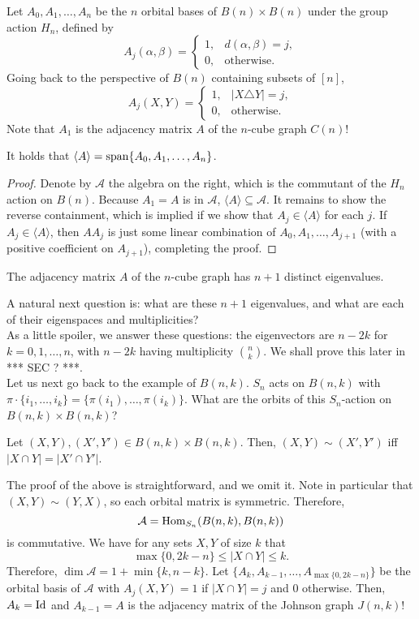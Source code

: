 	Let $A_0,A_1,\ldots,A_n$ be the $n$ orbital bases of $B(n) \times B(n)$ under the group action $H_n$, defined by
	\[ A_j(\alpha,\beta) = \begin{cases} 1, & d(\alpha,\beta) = j, \\ 0, & \text{otherwise.} \end{cases} \]
	Going back to the perspective of $B(n)$ containing subsets of $[n]$,
	\[ A_j(X,Y) = \begin{cases} 1, & |X\triangle Y| = j, \\ 0, & \text{otherwise.} \end{cases} \]
	Note that $A_1$ is the adjacency matrix $A$ of the $n$-cube graph $C(n)$!
	\begin{fprop}
		\label{prop: ncube-adj-eigenvals}
		It holds that $\langle A\rangle = \operatorname{span}\{A_0,A_1,\ldots,A_n\}$.
	\end{fprop}
	\begin{proof}
		Denote by $\mathcal{A}$ the algebra on the right, which is the commutant of the $H_n$ action on $B(n)$. Because $A_1 = A$ is in $\mathcal{A}$, $\langle A\rangle \subseteq \mathcal{A}$. It remains to show the reverse containment, which is implied if we show that $A_j \in \langle A\rangle$ for each $j$. If $A_j \in \langle A\rangle$, then $AA_j$ is just some linear combination of $A_0,A_1,\ldots,A_{j+1}$ (with a positive coefficient on $A_{j+1}$), completing the proof.
	\end{proof}

	\begin{fcor}
		The adjacency matrix $A$ of the $n$-cube graph has $n+1$ distinct eigenvalues.
	\end{fcor}

	A natural next question is: what are these $n+1$ eigenvalues, and what are each of their eigenspaces and multiplicities?\\
	As a little spoiler, we answer these questions: the eigenvectors are $n-2k$ for $k=0,1,\ldots,n$, with $n-2k$ having multiplicity $\binom{n}{k}$. We shall prove this later in *** SEC ? ***. \\

	Let us next go back to the example of $B(n,k)$. $S_n$ acts on $B(n,k)$ with $\pi \cdot \{i_1,\ldots,i_k\} = \{\pi(i_1),\ldots,\pi(i_k)\}$. What are the orbits of this $S_n$-action on $B(n,k) \times B(n,k)$?

	\begin{flem}
		Let $(X,Y), (X',Y') \in B(n,k) \times B(n,k)$. Then, $(X,Y) \sim (X',Y')$ iff $|X \cap Y| = |X' \cap Y'|$.
	\end{flem}
	The proof of the above is straightforward, and we omit it. Note in particular that $(X,Y) \sim (Y,X)$, so each orbital matrix is symmetric. Therefore,
	\[ \mathcal{A} = \operatorname{Hom}_{S_n}(B(n,k),B(n,k)) \]
	is commutative. We have for any sets $X,Y$ of size $k$ that
	\[ \max\{0,2k-n\} \le |X \cap Y| \le k. \]
	Therefore, $\dim \mathcal{A} = 1 + \min\{k,n-k\}$. Let $\{A_k,A_{k-1},\ldots,A_{\max\{0,2k-n\}}\}$ be the orbital basis of $\mathcal{A}$ with $A_j(X,Y) = 1$ if $|X \cap Y| = j$ and $0$ otherwise. Then,$A_k = \operatorname{Id}$ and $A_{k-1} = A$ is the adjacency matrix of the Johnson graph $J(n,k)$!


